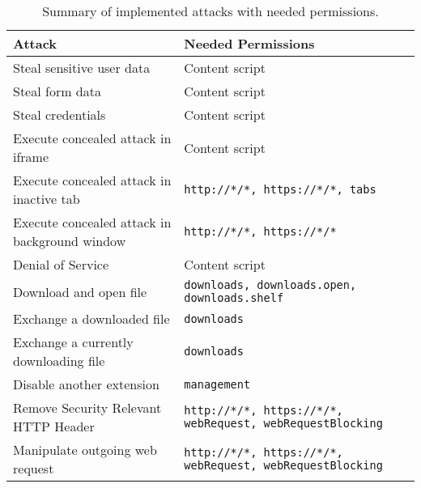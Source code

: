	\begin{table}
		\begin{tabular}{|l|l|} \hline 
			\textbf{Attack} & \textbf{Needed Permissions} \\ \hline
			Steal sensitive user data & Content script \\
			Steal form data & Content script \\
			Steal credentials & Content script \\
			\hline
			Execute concealed attack in iframe & Content script \\
			Execute concealed attack in inactive tab & \texttt{http://*/*, https://*/*, tabs} \\
			Execute concealed attack in background window & \texttt{http://*/*, https://*/*} \\
			\hline
			Denial of Service & Content script \\
			\hline
			Download and open file & \texttt{downloads, downloads.open, downloads.shelf} \\
			Exchange a downloaded file & \texttt{downloads} \\
			Exchange a currently downloading file & \texttt{downloads} \\
			\hline
			Disable another extension & \texttt{management} \\
			\hline
			Remove Security Relevant HTTP Header & \texttt{http://*/*, https://*/*, webRequest, webRequestBlocking} \\
			Manipulate outgoing web request & \texttt{http://*/*, https://*/*, webRequest, webRequestBlocking} \\
			\hline
		\end{tabular}
		\caption{Summary of implemented attacks with needed permissions.}
	\end{table}